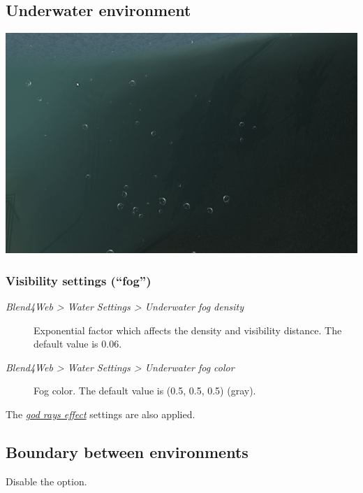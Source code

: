 \documentclass[a4paper,12pt,oneside]{sphinxmanual}
\begin{document}
\subsection{Underwater environment}
\label{outdoor_rendering:id17}
{\hfill\includegraphics[width=1.000\linewidth]{underwater.jpg}\hfill}


\subsubsection{Visibility settings (``fog'')}
\label{outdoor_rendering:id18}\begin{description}
\item[{\emph{Blend4Web \textgreater{} Water Settings \textgreater{} Underwater fog density}}] \leavevmode
Exponential factor which affects the density and visibility distance. The default value is 0.06.

\item[{\emph{Blend4Web \textgreater{} Water Settings \textgreater{} Underwater fog color}}] \leavevmode
Fog color. The default value is (0.5, 0.5, 0.5) (gray).

\end{description}

The {\hyperref[postprocessing_effects:god-rays]{\emph{god rays effect}}} settings are also applied.


\subsection{Boundary between environments}
\label{outdoor_rendering:id19}
Disable the  option.
\end{document}
